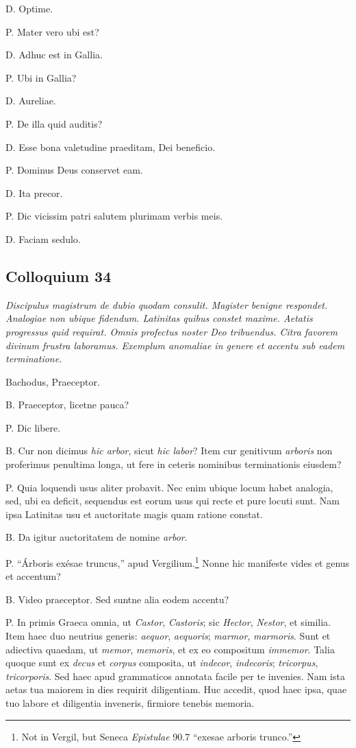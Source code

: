 \documentclass{article}
\begin{document}
D. Optime.

P. Mater vero ubi est?

D. Adhuc est in Gallia.

P. Ubi in Gallia?

D. Aureliae.

P. De illa quid auditis?

D. Esse bona valetudine praeditam, Dei beneficio.

P. Dominus Deus conservet eam.

D. Ita precor.

P. Dic vicissim patri salutem plurimam verbis meis.

D. Faciam sedulo.

\subsection{Colloquium 34}
\emph{Discipulus magistrum de dubio quodam consulit. Magister benigne respondet. Analogiae non ubique fidendum. Latinitas quibus constet maxime. Aetatis progressus quid requirat. Omnis profectus noster Deo tribuendus. Citra favorem divinum frustra laboramus. Exemplum anomaliae in genere et accentu sub eadem terminatione.}

Bachodus, Praeceptor.

B. Praeceptor, licetne pauca?

P. Dic libere.

B. Cur non dicimus \emph{hic arbor}, sicut \emph{hic labor}? Item cur genitivum \emph{arboris} non proferimus penultima longa, ut fere in ceteris nominibus terminationis eiusdem?

P. Quia loquendi usus aliter probavit. Nec enim ubique locum habet analogia, sed, ubi ea deficit, sequendus est eorum usus qui recte et pure locuti sunt. Nam ipsa Latinitas usu et auctoritate magis quam ratione constat.

B. Da igitur auctoritatem de nomine \emph{arbor}.

P. ``\'Arboris ex\'esae truncus,'' apud Vergilium.\footnote{Not in Vergil, but Seneca \emph{Epistulae} 90.7 ``exesae arboris trunco.''} Nonne hic manifeste vides et genus et accentum?

B. Video praeceptor. Sed suntne alia eodem accentu?

P. In primis Graeca omnia, ut \emph{Castor}, \emph{Castoris}; sic \emph{Hector}, \emph{Nestor}, et similia. Item haec duo neutrius generis: \emph{aequor}, \emph{aequoris}; \emph{marmor}, \emph{marmoris}. Sunt et adiectiva quaedam, ut \emph{memor}, \emph{memoris}, et ex eo compositum \emph{immemor}. Talia quoque sunt ex \emph{decus} et \emph{corpus} composita, ut \emph{indecor}, \emph{indecoris}; \emph{tricorpus}, \emph{tricorporis}. Sed haec apud grammaticos annotata facile per te invenies. Nam ista aetas tua maiorem in dies requirit diligentiam. Huc accedit, quod haec ipsa, quae tuo labore et diligentia inveneris, firmiore tenebis memoria.
\end{document}

